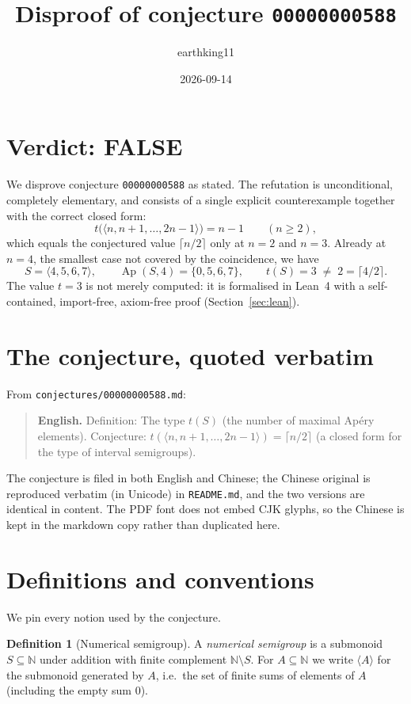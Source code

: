 \documentclass[11pt]{article}
\title{Disproof of conjecture \texttt{00000000588}}
\author{earthking11}
\date{2026-09-14}
\theoremstyle{definition}
\newtheorem{definition}[theorem]{Definition}
\theoremstyle{remark}
\newcommand{\N}{\mathbb{N}}
\newcommand{\Ap}{\operatorname{Ap}}
\newcommand{\gen}[1]{\langle #1 \rangle}
\begin{document}
\maketitle

\section*{Verdict: FALSE}

We disprove conjecture \texttt{00000000588} as stated. The refutation is
unconditional, completely elementary, and consists of a single explicit
counterexample together with the correct closed form:
\[
t\bigl(\gen{n, n+1, \dots, 2n-1}\bigr) = n-1 \qquad (n \ge 2),
\]
which equals the conjectured value $\lceil n/2 \rceil$ only at $n = 2$ and
$n = 3$. Already at $n = 4$, the smallest case not covered by the coincidence,
we have
\[
S = \gen{4,5,6,7}, \qquad \Ap(S,4) = \{0,5,6,7\}, \qquad t(S) = 3
\;\neq\; 2 = \lceil 4/2 \rceil .
\]
The value $t = 3$ is not merely computed: it is formalised in Lean~4 with a
self-contained, import-free, axiom-free proof (Section~\ref{sec:lean}).

\section{The conjecture, quoted verbatim}

From \texttt{conjectures/00000000588.md}:

\begin{quote}
\textbf{English.} Definition: The type $t(S)$ (the number of maximal Apéry
elements). Conjecture: $t(\gen{n, n+1, \dots, 2n-1}) = \lceil n/2 \rceil$
(a closed form for the type of interval semigroups).
\end{quote}

The conjecture is filed in both English and Chinese; the Chinese original is
reproduced verbatim (in Unicode) in \texttt{README.md}, and the two versions are
identical in content. The PDF font does not embed CJK glyphs, so the Chinese is
kept in the markdown copy rather than duplicated here.

\section{Definitions and conventions}

We pin every notion used by the conjecture.

\begin{definition}[Numerical semigroup]\label{def:semigroup}
A \emph{numerical semigroup} is a submonoid $S \subseteq \N$ under addition with
finite complement $\N \setminus S$. For $A \subseteq \N$ we write $\gen{A}$ for
the submonoid generated by $A$, i.e.\ the set of finite sums of elements of $A$
(including the empty sum $0$).
\end{definition}
\end{document}
